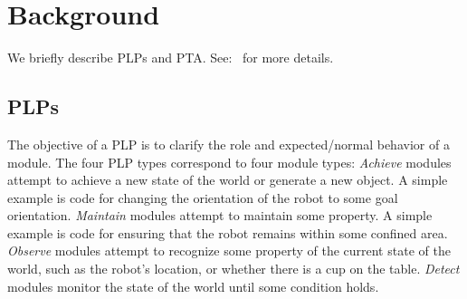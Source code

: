 \documentclass[letterpaper]{article}
\begin{document}
\section{Background}
We briefly describe PLPs and PTA.
See:~\citet{PLP-IROS16,PTA} for more details.


\subsection{PLPs}
The objective of a PLP is to clarify the role and expected/normal behavior of a module.
%
The four PLP types correspond to four module types: {\em Achieve} modules attempt to achieve a new state of the world
or generate a new object. A simple example is code for changing the orientation of the robot to some goal orientation. {\em Maintain} modules attempt to maintain some property. A simple example is code for  ensuring that the robot remains within some confined area. 
{\em Observe}  modules  attempt to recognize some property of the current state of the world, such as the robot's location, or whether there is a cup on the table.
 {\em Detect\/} modules monitor the state of the world until some condition holds.
\end{document}
